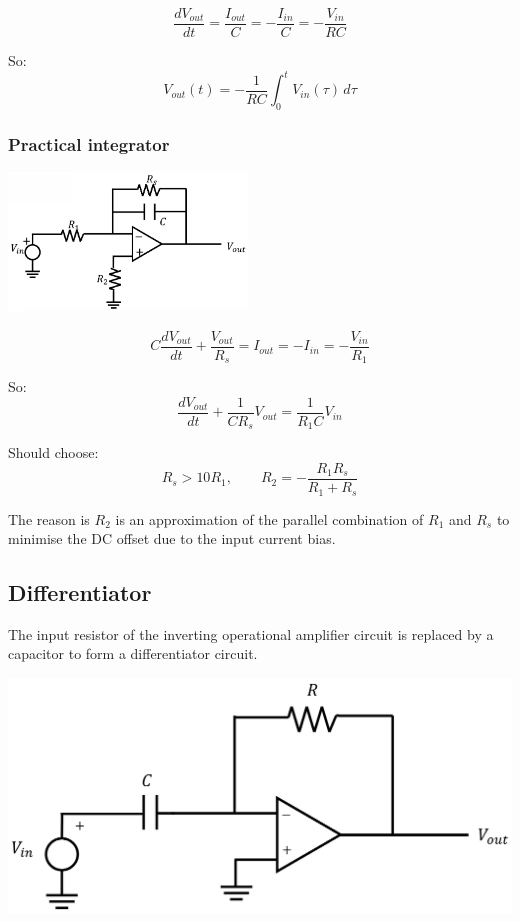 \documentclass[11pt]{article}
\begin{document}
\[\frac{dV_{out}}{dt} = \frac{I_{out}}{C} = -\frac{I_{in}}{C} = - \frac{V_{in}}{RC}\]

So:
\[V_{out} (t) = - \frac{1}{RC} \int_0^t V_{in} (\tau) \, d \tau\]
\subsubsection{Practical integrator}
\label{sec:org235d0dd}
\begin{center}
\includegraphics[height=10em]{./images/practical-integrator-circuit.png}
\end{center}

\[C \frac{dV_{out}}{dt} + \frac{V_{out}}{R_s} = I_{out} = - I_{in} = - \frac{V_{in}}{R_1}\]

So:
\[\frac{dV_{out}}{dt} + \frac{1}{CR_s} V_{out} = \frac{1}{R_1 C} V_{in}\]

Should choose:
\[R_s > 10 R_1, \qquad R_2 = - \frac{R_1 R_s}{R_1 + R_s}\]

The reason is \(R_2\) is an approximation of the parallel combination of \(R_1\) and \(R_s\) to minimise the DC offset due to the input current bias.
\subsection{Differentiator}
\label{sec:org6b5d9e9}
The input resistor of the inverting operational amplifier circuit is replaced by a capacitor to form a differentiator circuit.
\begin{center}
\includegraphics[width=.9\linewidth]{./images/differentiator-circuit.png}
\end{center}
\end{document}
